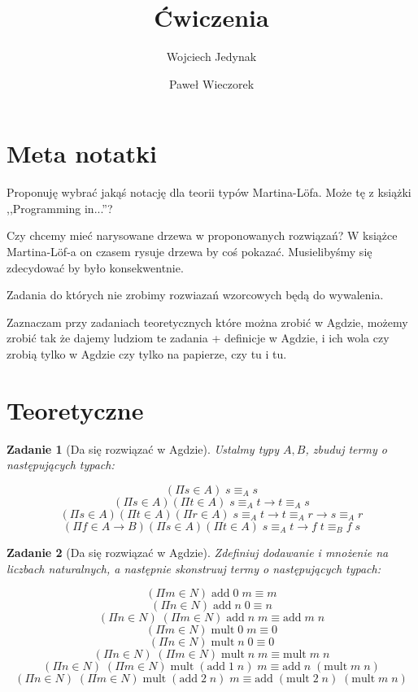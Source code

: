\documentclass[10pt, a4paper]{article}
\author{Wojciech Jedynak \and Paweł Wieczorek}
\title{Ćwiczenia}
\newtheorem{zadanie}{Zadanie}
\begin{document}
\maketitle

\section*{Meta notatki}

Proponuję wybrać jakąś notację dla teorii typów Martina-L\"{o}fa. Może tę z książki ,,Programming in...''?


Czy chcemy mieć narysowane drzewa w proponowanych rozwiązań? W książce Martina-L\"{o}f-a on czasem rysuje drzewa
by coś pokazać. Musielibyśmy się zdecydować by było konsekwentnie.

Zadania do których nie zrobimy rozwiazań wzorcowych będą do wywalenia.

Zaznaczam przy zadaniach teoretycznych które można zrobić w Agdzie, możemy zrobić tak że dajemy ludziom te zadania
+ definicje w Agdzie, i ich wola czy zrobią tylko w Agdzie czy tylko na papierze, czy tu i tu.

\section{Teoretyczne}

\begin{zadanie}[Da się rozwiązać w Agdzie]
Ustalmy typy $A, B$, zbuduj termy o następujących typach:

\[
 (\Pi s \in A)\; s \equiv_A s
\]
\[
  (\Pi s \in A)(\Pi t \in A)\; s \equiv_A t \to t \equiv_A s
\]
\[
  (\Pi s \in A)(\Pi t \in A)(\Pi r \in A)\; s \equiv_A t \to t \equiv_A r \to s \equiv_A r
\]
\[
  (\Pi f \in A \to B)(\Pi s \in A)(\Pi t \in A)\; s \equiv_A t \to f\;t \equiv_B f\;s
\]

\end{zadanie}

\begin{zadanie}[Da się rozwiązać w Agdzie]
Zdefiniuj dodawanie i mnożenie na liczbach naturalnych, a następnie skonstruuj termy o następujących typach:

\[
 (\Pi m \in N)\;\mbox{add}\;0\;m \equiv m
\]
\[
 (\Pi n \in N)\;\mbox{add}\;n\;0 \equiv n
\]
\[
 (\Pi n \in N)\;(\Pi m \in N)\;\mbox{add}\;n\;m \equiv \mbox{add}\;m\;n
\]
\[
 (\Pi m \in N)\;\mbox{mult}\;0\;m \equiv 0
\]
\[
 (\Pi n \in N)\;\mbox{mult}\;n\;0 \equiv 0
\]
\[
 (\Pi n \in N)\;(\Pi m \in N)\;\mbox{mult}\;n\;m \equiv \mbox{mult}\;m\;n
\]
\[
 (\Pi n \in N)\;(\Pi m \in N)\;\mbox{mult}\;(\mbox{add}\;1\;n)\;m \equiv \mbox{add}\;n\;(\mbox{mult}\;m\;n)
\]
\[
 (\Pi n \in N)\;(\Pi m \in N)\;\mbox{mult}\;(\mbox{add}\;2\;n)\;m \equiv \mbox{add}\;(\mbox{mult}\; 2\; n)\;(\mbox{mult}\;m\;n)
\]

\end{zadanie}
\end{document}
